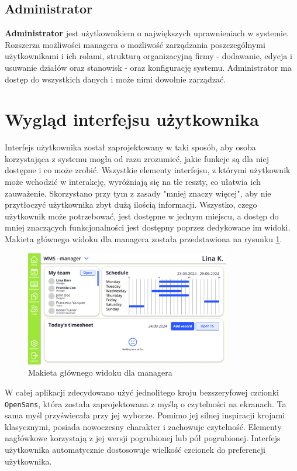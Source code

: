 \subsection{Administrator}

\textbf{Administrator} jest użytkownikiem o największych uprawnieniach w systemie. Rozszerza możliwości managera o możliwość zarządzania poszczególnymi użytkownikami i ich rolami, strukturą organizacyjną firmy - dodawanie, edycja i usuwanie działów oraz stanowisk - oraz konfigurację systemu. Administrator ma dostęp do wszystkich danych i może nimi dowolnie zarządzać.

\section{Wygląd interfejsu użytkownika}

Interfejs użytkownika został zaprojektowany w taki sposób, aby osoba korzystająca z systemu mogła od razu zrozumieć, jakie funkcje są dla niej dostępne i co może zrobić. Wszystkie elementy interfejsu, z którymi użytkownik może wchodzić w interakcję, wyróżniają się na tle reszty, co ułatwia ich zauważenie. Skorzystano przy tym z zasady "mniej znaczy więcej", aby nie przytłoczyć użytkownika zbyt dużą ilością informacji. Wszystko, czego użytkownik może potrzebować, jest dostępne w jednym miejscu, a dostęp do mniej znaczących funkcjonalności jest dostępny poprzez dedykowane im widoki. Makieta głównego widoku dla managera została przedstawiona na rysunku \ref{fig:mainLayout}.

\begin{figure}[H]
    \centering
    \includegraphics[width=0.8\textwidth, frame]{graf/mainLayout.png}
    \caption{Makieta głównego widoku dla managera}
    \label{fig:mainLayout}
\end{figure}

W całej aplikacji zdecydowano użyć jednolitego kroju bezszeryfowej czcionki \texttt{Open\nolinebreak Sans}, która została zaprojektowana z myślą o czytelności na ekranach. Ta sama myśl przyświecała przy jej wyborze. Pomimo jej silnej inspiracji krojami klasycznymi, posiada nowoczesny charakter i zachowuje czytelność. Elementy nagłówkowe korzystają z jej wersji pogrubionej lub pół pogrubionej. Interfejs użytkownika automatycznie dostosowuje wielkość czcionek do preferencji użytkownika.

